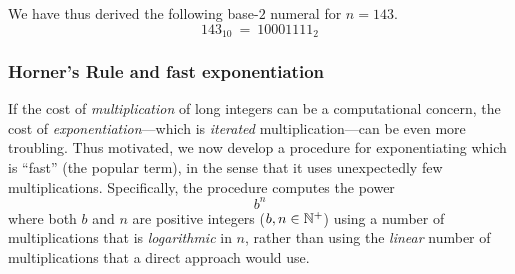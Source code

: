 \bigskip

\noindent
We have thus derived the following base-$2$ numeral for $n = 143$.
\[ 143_{10} \ = \ 10001111_2 \]


\subsubsection{Horner's Rule and fast exponentiation} 

If the cost of {\em multiplication} of long integers can be a computational concern, the cost of {\em exponentiation}---which is {\em iterated} multiplication---can be even more troubling.  Thus motivated, we now develop a procedure for exponentiating which is ``fast'' (the popular term), in the sense that it uses unexpectedly few multiplications.  Specifically, the procedure computes the power
\[ b^n \]
where both $b$ and $n$ are positive integers ($b, n \in \mathbb{N}^+$) using a number of multiplications that is {\em logarithmic} in $n$, rather than using the {\em linear} number of multiplications that a direct approach would use.

\bigskip

\noindent {}

\bigskip


